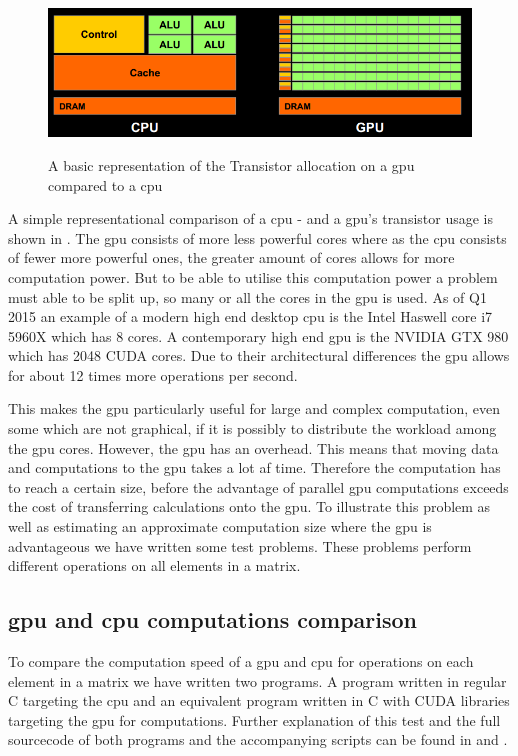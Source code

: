 \begin{figure}[h!]
\centering
 \includegraphics[width=1\textwidth]{figures/gpucpuimage.png} %
\caption{A basic representation of the Transistor allocation on a \acrshort{gpu} compared to a \acrshort{cpu}}\label{image:gpucpuimage}\citep{NvidiaCUDASeminar}
\vspace{-15pt}
\end{figure}

A simple representational comparison of a \acrshort{cpu} - and a \acrshort{gpu}'s transistor usage is shown in .
The \acrshort{gpu} consists of more less powerful cores where as the \acrshort{cpu} consists of fewer more powerful ones, the greater amount of cores allows for more computation power.
But to be able to utilise this computation power a problem must able to be split up, so many or all the cores in the \acrshort{gpu} is used.
As of Q1 2015 an example of a modern high end desktop \acrshort{cpu} is the Intel Haswell core i7 5960X which has 8 cores. \citep{puget}
A contemporary high end \acrshort{gpu} is the NVIDIA GTX 980 which has 2048 CUDA cores. \citep{techpowerup,gtx980}
Due to their architectural differences the \acrshort{gpu} allows for about 12 times more operations per second.

This makes the \acrshort{gpu} particularly useful for large and complex computation, even some which are not graphical, if it is possibly to distribute the workload among the \acrshort{gpu} cores.
However, the \acrshort{gpu} has an overhead.
This means that moving data and computations to the \acrshort{gpu} takes a lot af time.
Therefore the computation has to reach a certain size, before the advantage of parallel \acrshort{gpu} computations exceeds the cost of transferring calculations onto the \acrshort{gpu}.
To illustrate this problem as well as estimating an approximate computation size where the \acrshort{gpu} is advantageous we have written some test problems. 
These problems perform different operations on all elements in a matrix. 

\subsection{\acrshort{gpu} and \acrshort{cpu} computations comparison}
To compare the computation speed of a \acrshort{gpu} and \acrshort{cpu} for operations on each element in a matrix we have written two programs.
A program written in regular C targeting the \acrshort{cpu} and an equivalent program written in C with CUDA libraries targeting the \acrshort{gpu} for computations.
Further explanation of this test and the full sourcecode of both programs and the accompanying scripts can be found in  and .

